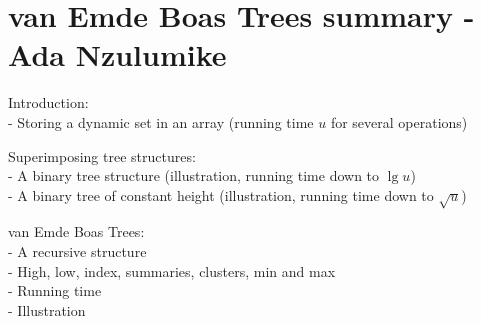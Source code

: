 \section*{van Emde Boas Trees summary - Ada Nzulumike}

Introduction:
\\
- Storing a dynamic set in an array (running time $u$ for several operations)

Superimposing tree structures:
\\
- A binary tree structure (illustration, running time down to $\lg u$)
\\
- A binary tree of constant height (illustration, running time down to $\sqrt{u}$)

van Emde Boas Trees:
\\
- A recursive structure
\\
- High, low, index, summaries, clusters, min and max
\\
- Running time
\\
- Illustration